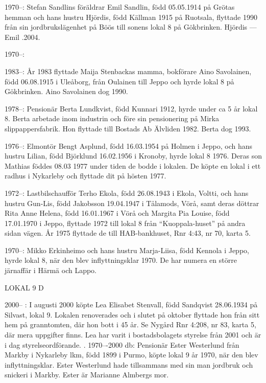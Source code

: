 1970--:	Stefan Sandlins föräldrar Emil Sandlin, född 05.05.1914 på Grötas hemman och hans hustru Hjördis, född  Källman 1915 på Ruotsala, flyttade 1990 från sin jordbrukslägenhet på Böös till sonens lokal 8 på Gökbrinken.
Hjördis   ---  Emil .2004.

 1970--:

1983--: År 1983 flyttade Maija Stenbackas mamma, bokförare Aino Savolainen, född 06.08.1915 i Uleåborg, från Oulainen till Jeppo och hyrde lokal 8 på Gökbrinken. Aino Savolainen dog 1990.

1978--: Pensionär Berta Lundkvist, född Kunnari 1912, hyrde under ca 5 år lokal 8. Berta arbetade inom industrin och före sin pensionering på Mirka slippappersfabrik. Hon flyttade till Bostads Ab Älvliden 1982. Berta dog 1993.

1976--: Elmontör Bengt Asplund, född 16.03.1954 på Holmen i Jeppo, och hans hustru Lilian, född Björklund 16.02.1956 i Kronoby, hyrde lokal 8 1976. Deras son Mathias föddes 08.03 1977 under tiden de bodde i lokalen. De köpte en lokal i ett radhus i Nykarleby och flyttade dit på hösten 1977.

1972--: Lastbilschaufför Terho Ekola, född 26.08.1943 i Ekola, Voltti, och hans hustru Gun-Lis, född Jakobsson 19.04.1947 i Tålamods, Vörå, samt deras döttrar Rita Anne Helena, född 16.01.1967 i Vörå och Margita Pia Louise, född 17.01.1970 i Jeppo, flyttade 1972 till lokal 8 från ``Kuoppala-huset'' på andra sidan vägen. År 1975 flyttade de till HAB-bankhuset, Rnr 4:43, nr 70, karta 5.

1970--: Mikko Erkinheimo och hans hustru Marja-Liisa, född Kennola i Jeppo, hyrde lokal 8, när den blev inflyttningsklar 1970. De har numera en större järnaffär i Härmä och Lappo.


LOKAL 9 D

 2000-- :
I augusti 2000 köpte Lea Elisabet Stenvall, född Sandqvist 28.06.1934 på Silvast, lokal 9. Lokalen renoverades och i slutet på oktober flyttade hon från sitt hem på granntomten, där hon bott i 45 år. Se Nygård Rnr 4:208, nr 83, karta 5, där mera uppgifter finns. Lea har varit i bostadsbolagets styrelse från 2001 och är i dag styrelseordförande.
		.
 1970---2000 db:
Pensionär Ester Westerlund från Markby i Nykarleby lkm, född 1899 i Purmo, köpte lokal 9 år 1970, när den blev inflyttningsklar. Ester Westerlund hade tillsammans med sin man jordbruk och snickeri i Markby. Ester är Marianne Almbergs mor.

